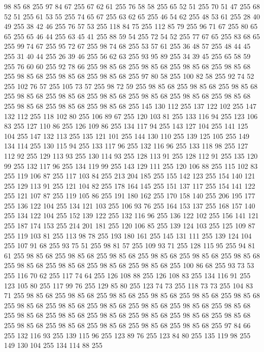 98 85 68 255 97 84 67 255 67 62 61 255 76 58 58 255 65 52 51 255 70 51 47 255 68 52 51 255 61 53 55 255 74 65 67 255 63 62 65 255 46 54 62 255 48 53 61 255 28 40 49 255 38 42 46 255 76 57 53 255 118 84 75 255 112 85 79 255 96 71 67 255 80 65 65 255 65 46 44 255 63 45 41 255 88 59 54 255 72 54 52 255 77 67 65 255 83 68 65 255 99 74 67 255 95 72 67 255 98 74 68 255 53 57 61 255 36 48 57 255 48 44 45 255 31 40 44 255 26 39 46 255 56 62 63 255 93 95 89 255 34 39 45 255 65 58 59 255 76 60 60 255 92 78 66 255 98 85 68 255 98 85 68 255 98 85 68 255 98 85 68 255 98 85 68 255 98 85 68 255 98 85 68 255 97 80 58 255 100 82 58 255 92 74 52 255 102 76 57 255 105 73 57 255 98 72 59 255 98 85 68 255 98 85 68 255 98 85 68 255 98 85 68 255 98 85 68 255 98 85 68 255 98 85 68 255 98 85 68 255 98 85 68 255 98 85 68 255 98 85 68 255 98 85 68 255
145 130 112 255 137 122 102 255 147 132 112 255 118 102 80 255 106 89 67 255 120 103 81 255 133 116 94 255 123 106 83 255 127 110 86 255 126 109 86 255 134 117 94 255 143 127 104 255 141 125 104 255 147 132 113 255 135 121 101 255 144 130 110 255 139 125 105 255 149 134 114 255 130 115 94 255 133 117 96 255 132 116 96 255 133 118 98 255 127 112 92 255 129 113 93 255 130 114 93 255 128 113 91 255 128 112 91 255 135 120 99 255 132 117 96 255 134 119 99 255 143 129 111 255 120 106 88 255 115 102 83 255 119 106 87 255 117 103 84 255 213 204 185 255 155 142 123 255 154 140 121 255 129 113 91 255 121 104 82 255 178 164 145 255 151 137 117 255 154 141 122 255 121 107 87 255 119 105 86 255 191 180 162 255 170 158 140 255 206 195 177 255 136 122 104 255 134 121 103 255 106 93 76 255 164 153 137 255 168 157 140 255 134 122 104 255 152 139 122 255 132 116 96 255 136 122 102 255 156 141 121 255 187 174 153 255 214 201 181 255 120 106 85 255 139 124 103 255 125 109 87 255 119 103 81 255
113 98 78 255 193 180 161 255 145 131 111 255 139 124 104 255 107 91 68 255 93 75 51 255 98 81 57 255 109 93 71 255 128 115 95 255 94 81 61 255 98 85 68 255 98 85 68 255 98 85 68 255 98 85 68 255 98 85 68 255 98 85 68 255 98 85 68 255 98 85 68 255 98 85 68 255 98 85 68 255 100 86 68 255 93 73 53 255 116 70 62 255 117 74 64 255 126 108 88 255 126 108 83 255 134 116 91 255 123 105 80 255 117 99 76 255 129 85 80 255 123 74 73 255 118 73 73 255 104 83 71 255 98 85 68 255 98 85 68 255 98 85 68 255 98 85 68 255 98 85 68 255 98 85 68 255 98 85 68 255 98 85 68 255 98 85 68 255 98 85 68 255 98 85 68 255 98 85 68 255 98 85 68 255 98 85 68 255 98 85 68 255 98 85 68 255 98 85 68 255 98 85 68 255 98 85 68 255 98 85 68 255 98 85 68 255 98 85 68 255 98 85 68 255 97 84 66 255 132 116 93 255 139 115 96 255 123 89 76 255 123 84 80 255 135 119 98 255 149 130 104 255 134 114 88 255
